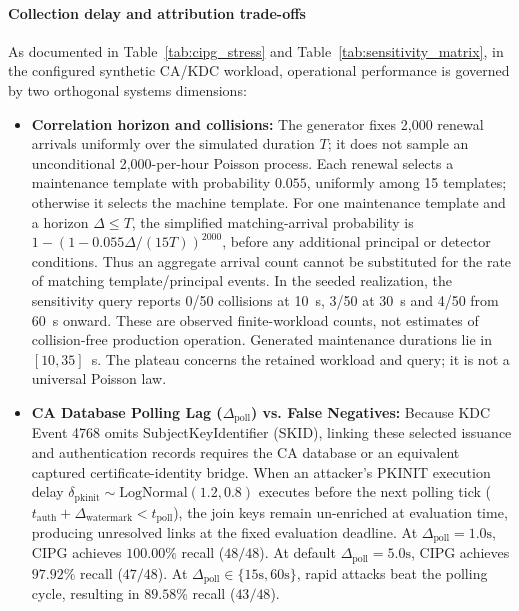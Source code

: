 \paragraph{Collection delay and attribution trade-offs}
As documented in Table~\ref{tab:cipg_stress} and Table~\ref{tab:sensitivity_matrix}, in the configured synthetic CA/KDC workload, operational performance is governed by two orthogonal systems dimensions:
\begin{itemize}
    \item \textbf{Correlation horizon and collisions:} The generator fixes 2,000 renewal arrivals uniformly over the simulated duration $T$; it does not sample an unconditional 2,000-per-hour Poisson process. Each renewal selects a maintenance template with probability $0.055$, uniformly among 15 templates; otherwise it selects the machine template. For one maintenance template and a horizon $\Delta\le T$, the simplified matching-arrival probability is $1-(1-0.055\Delta/(15T))^{2000}$, before any additional principal or detector conditions. Thus an aggregate arrival count cannot be substituted for the rate of matching template/principal events. In the seeded realization, the sensitivity query reports 0/50 collisions at 10~s, 3/50 at 30~s and 4/50 from 60~s onward. These are observed finite-workload counts, not estimates of collision-free production operation. Generated maintenance durations lie in $[10,35]$~s. The plateau concerns the retained workload and query; it is not a universal Poisson law.
    \item \textbf{CA Database Polling Lag ($\Delta_{\text{poll}}$) vs. False Negatives:} Because KDC Event 4768 omits SubjectKeyIdentifier (SKID), linking these selected issuance and authentication records requires the CA database or an equivalent captured certificate-identity bridge. When an attacker's PKINIT execution delay $\delta_{\text{pkinit}} \sim \text{LogNormal}(1.2, 0.8)$ executes before the next polling tick ($t_{\text{auth}} + \Delta_{\text{watermark}} < t_{\text{poll}}$), the join keys remain un-enriched at evaluation time, producing unresolved links at the fixed evaluation deadline. At $\Delta_{\text{poll}} = 1.0\text{s}$, CIPG achieves $100.00\%$ recall ($48/48$). At default $\Delta_{\text{poll}} = 5.0\text{s}$, CIPG achieves $97.92\%$ recall ($47/48$). At $\Delta_{\text{poll}} \in \{15\text{s}, 60\text{s}\}$, rapid attacks beat the polling cycle, resulting in $89.58\%$ recall ($43/48$).
\end{itemize}

